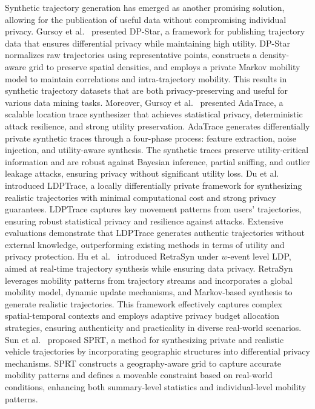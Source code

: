 Synthetic trajectory generation has emerged as another promising solution, allowing for the publication of useful data without compromising individual privacy. 
Gursoy et al.~\cite{gursoy2018differentially} presented DP-Star, a framework for publishing trajectory data that ensures differential privacy while maintaining high utility. DP-Star normalizes raw trajectories using representative points, constructs a density-aware grid to preserve spatial densities, and employs a private Markov mobility model to maintain correlations and intra-trajectory mobility. This results in synthetic trajectory datasets that are both privacy-preserving and useful for various data mining tasks.
Moreover, Gursoy et al.~\cite{gursoy2018utility} presented AdaTrace, a scalable location trace synthesizer that achieves statistical privacy, deterministic attack resilience, and strong utility preservation. AdaTrace generates differentially private synthetic traces through a four-phase process: feature extraction, noise injection, and utility-aware synthesis. The synthetic traces preserve utility-critical information and are robust against Bayesian inference, partial sniffing, and outlier leakage attacks, ensuring privacy without significant utility loss.
Du et al.~\cite{du2023ldptrace} introduced LDPTrace, a locally differentially private framework for synthesizing realistic trajectories with minimal computational cost and strong privacy guarantees. LDPTrace captures key movement patterns from users' trajectories, ensuring robust statistical privacy and resilience against attacks. Extensive evaluations demonstrate that LDPTrace generates authentic trajectories without external knowledge, outperforming existing methods in terms of utility and privacy protection.
Hu et al.~\cite{hu2024real} introduced RetraSyn under $w$-event level LDP, aimed at real-time trajectory synthesis while ensuring data privacy. RetraSyn leverages mobility patterns from trajectory streams and incorporates a global mobility model, dynamic update mechanisms, and Markov-based synthesis to generate realistic trajectories. This framework effectively captures complex spatial-temporal contexts and employs adaptive privacy budget allocation strategies, ensuring authenticity and practicality in diverse real-world scenarios.
Sun et al.~\cite{sun2023synthesizing} proposed SPRT, a method for synthesizing private and realistic vehicle trajectories by incorporating geographic structures into differential privacy mechanisms. SPRT constructs a geography-aware grid to capture accurate mobility patterns and defines a moveable constraint based on real-world conditions, enhancing both summary-level statistics and individual-level mobility patterns.





